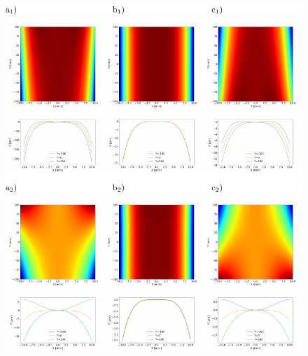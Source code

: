 \documentclass{iucr}       %
\begin{document}
\begin{figure}\label{fig:detrended}
\includegraphics[width=1.0\textwidth]{figures/fig7.pdf}


\end{figure}
\end{document}
